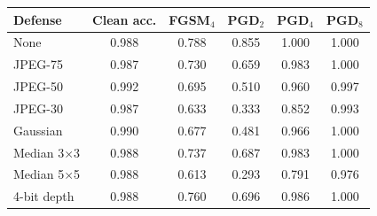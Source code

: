 \begin{tabular}{lccccc}
\toprule
Defense & Clean acc. & FGSM$_4$ & PGD$_2$ & PGD$_4$ & PGD$_8$ \\
\midrule
None & 0.988 & 0.788 & 0.855 & 1.000 & 1.000 \\
JPEG-75 & 0.987 & 0.730 & 0.659 & 0.983 & 1.000 \\
JPEG-50 & 0.992 & 0.695 & 0.510 & 0.960 & 0.997 \\
JPEG-30 & 0.987 & 0.633 & 0.333 & 0.852 & 0.993 \\
Gaussian & 0.990 & 0.677 & 0.481 & 0.966 & 1.000 \\
Median 3$\times$3 & 0.988 & 0.737 & 0.687 & 0.983 & 1.000 \\
Median 5$\times$5 & 0.988 & 0.613 & 0.293 & 0.791 & 0.976 \\
4-bit depth & 0.988 & 0.760 & 0.696 & 0.986 & 1.000 \\
\bottomrule
\end{tabular}
